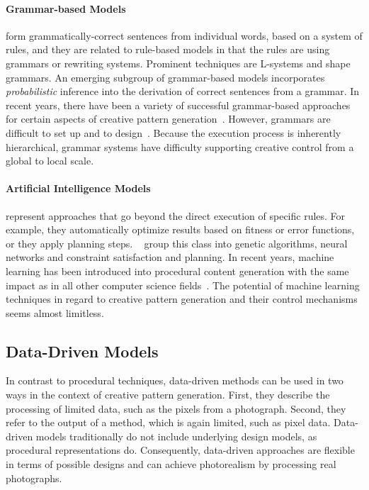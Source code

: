 \paragraph*{Grammar-based Models}
form grammatically-correct sentences from individual words, based on a system of rules, and they are related to rule-based models in that the rules are using grammars or rewriting systems. 
Prominent techniques are L-systems and shape grammars. An emerging subgroup of grammar-based models incorporates \textit{probabilistic} inference into the derivation of correct sentences from a grammar. In recent years, there have been a variety of successful grammar-based approaches for certain aspects of creative pattern generation~\cite{benes_2011_gpm,talton_2011_mpm,ritchie_2015_cpm}. However, grammars are difficult to set up and to design~\cite{stava_2010_ipm}. Because the execution process is inherently hierarchical, grammar systems have difficulty supporting creative control from a global to local scale.


\paragraph*{Artificial Intelligence Models} represent approaches that go beyond the direct execution of specific rules. For example, they automatically optimize results based on fitness or error functions, or they apply planning steps. \citeauthor*{hendrikx_2013_pcg}~\cite{hendrikx_2013_pcg} group this class into genetic algorithms, neural networks and constraint satisfaction and planning. In recent years, machine learning has been introduced into procedural content generation with the same impact as in all other computer science fields~\cite{summerville_2017_pcg}. The potential of machine learning techniques in regard to creative pattern generation and their control mechanisms seems almost limitless.



\subsection[Data-Driven]{Data-Driven Models}
\label{subsec:design_models_datadriven}

In contrast to procedural techniques, data-driven methods can be used in two ways in the context of creative pattern generation. First, they describe the processing of limited data, such as the pixels from a photograph. Second, they refer to the output of a method, which is again limited, such as pixel data. Data-driven models traditionally do not include underlying design models, as procedural representations do. Consequently, data-driven approaches are flexible in terms of possible designs and can achieve photorealism by processing real photographs.

